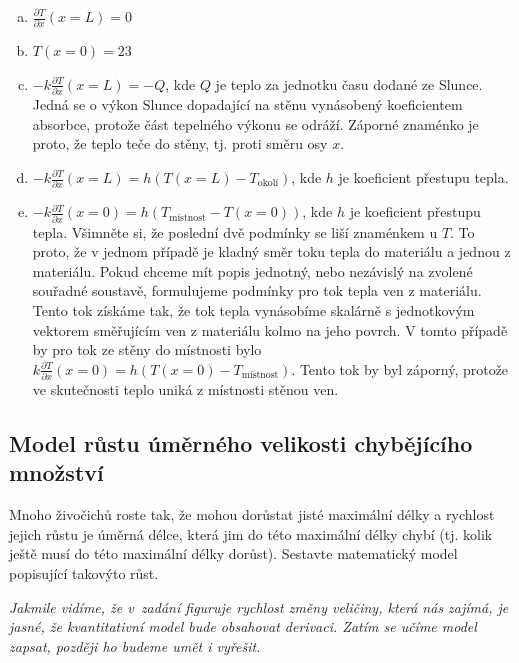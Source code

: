 \begin{enumerate}[a)]
\item $\frac{\partial T}{\partial x}(x=L)=0$
\item $T(x=0)=23$
\item $-k\frac{\partial T}{\partial x}(x=L)=-Q$, kde $Q$ je teplo za jednotku času dodané ze Slunce. Jedná se o výkon Slunce dopadající na stěnu vynásobený koeficientem absorbce, protože část tepelného výkonu se odráží. Záporné znaménko je proto, že teplo teče do stěny, tj. proti směru osy $x$.
\item $-k\frac{\partial T}{\partial x}(x=L)=h(T(x=L)-T_{\text{okolí}})$, kde $h$ je koeficient přestupu tepla.
\item $-k\frac{\partial T}{\partial x}(x=0)=h(T_{\text{místnost}}-T(x=0))$, kde $h$ je koeficient přestupu tepla.
  Všimněte si, že poslední dvě podmínky se liší znaménkem u $T$. To proto, že v jednom případě je kladný směr toku tepla do materiálu a jednou z materiálu. Pokud chceme mít popis jednotný, nebo nezávislý na zvolené souřadné soustavě, formulujeme podmínky pro tok tepla ven z materiálu. Tento tok získáme tak, že tok tepla vynásobíme skalárně s jednotkovým vektorem směřujícím ven z materiálu kolmo na jeho povrch. V tomto případě by pro tok ze stěny do místnosti bylo $k\frac{\partial T}{\partial x}(x=0)=h(T(x=0)-T_{\text{místnost}})$. Tento tok by byl záporný, protože ve skutečnosti teplo uniká z místnosti stěnou ven.
\end{enumerate}
\konec

\subsection{Model růstu úměrného velikosti chybějícího množství}  \label{krava}
Mnoho
živočichů roste tak, že mohou dorůstat jisté maximální délky a
rychlost jejich růstu je úměrná délce, která jim do této maximální
délky chybí (tj. kolik ještě musí do této maximální délky
dorůst). Sestavte matematický model popisující takovýto růst.


\textit{Jakmile vidíme, že v zadání figuruje rychlost změny veličiny,
  která nás zajímá, je jasné, že kvantitativní model bude obsahovat
  derivaci. Zatím se učíme model zapsat, později ho budeme umět i vyřešit.}



